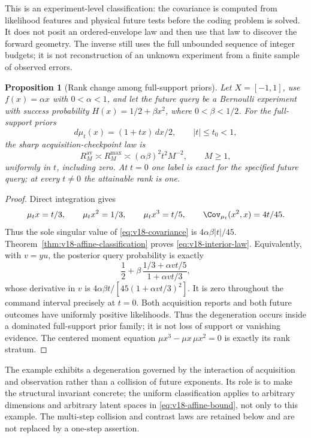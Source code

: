 \documentclass[11pt]{amsart}
\newtheorem{proposition}[theorem]{Proposition}
\theoremstyle{definition}\newtheorem{definition}[theorem]{Definition}
\theoremstyle{remark}\newtheorem{remark}[theorem]{Remark}
\begin{document}
This is an experiment-level classification: the covariance is computed
from likelihood features and physical future tests before the coding
problem is solved. It does not posit an ordered-envelope law and then
use that law to discover the forward geometry. The inverse still uses
the full unbounded sequence of integer budgets; it is not reconstruction
of an unknown experiment from a finite sample of observed errors.

\begin{proposition}[Rank change among full-support priors]
\label{prop:v18-interior-example}
Let $X=[-1,1]$, use $f(x)=\alpha x$ with $0<\alpha<1$, and let the
future query be a Bernoulli experiment with success probability
$H(x)=1/2+\beta x^2$, where $0<\beta<1/2$. For the full-support priors
\[
 d\mu_t(x)=(1+tx)\,dx/2,\qquad |t|\le t_0<1,
\]
the sharp acquisition-checkpoint law is
\begin{equation}\label{eq:v18-interior-law}
 R^{\mathrm{av}}_M\asymp R^{\mathrm{max}}_M
 \asymp (\alpha\beta)^2t^2M^{-2},\qquad M\ge1,
\end{equation}
uniformly in $t$, including zero. At $t=0$ one label is exact for the
specified future query; at every $t\ne0$ the attainable rank is one.
\end{proposition}
\begin{proof}
Direct integration gives
\[
 \mu_tx=t/3,\qquad \mu_tx^2=1/3,\qquad \mu_tx^3=t/5,
 \qquad \Cov_{\mu_t}(x^2,x)=4t/45.
\]
Thus the sole singular value of \eqref{eq:v18-covariance} is
$4\alpha\beta|t|/45$. Theorem~\ref{thm:v18-affine-classification}
proves \eqref{eq:v18-interior-law}. Equivalently, with $v=yu$, the
posterior query probability is exactly
\[
 \frac12+\beta\,
 \frac{1/3+\alpha vt/5}{1+\alpha vt/3},
\]
whose derivative in $v$ is
$4\alpha\beta t/[45(1+\alpha vt/3)^2]$.
It is zero throughout the command interval precisely at $t=0$.
Both acquisition reports and both future outcomes have uniformly
positive likelihoods. Thus the degeneration occurs inside a dominated
full-support prior family; it is not loss of support or vanishing
evidence. The centered moment equation $\mu x^3-\mu x\,\mu x^2=0$
is exactly its rank stratum.
\end{proof}

The example exhibits a degeneration governed by the interaction of
acquisition and observation rather than a collision of future exponents.
Its role is to make the structural invariant concrete; the uniform
classification applies to arbitrary dimensions and arbitrary latent
spaces in \eqref{eq:v18-affine-bound}, not only to this example. The
multi-step collision and contrast laws are retained below and are not
replaced by a one-step assertion.
\end{document}
